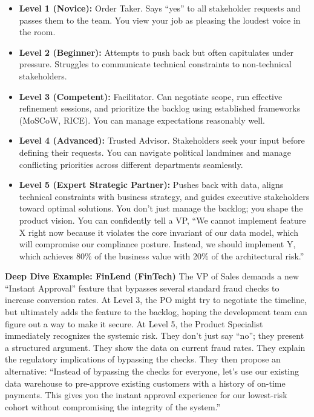 \begin{itemize}
\tightlist
\item
  \textbf{Level 1 (Novice):} Order Taker. Says ``yes'' to all
  stakeholder requests and passes them to the team. You view your job as
  pleasing the loudest voice in the room.
\item
  \textbf{Level 2 (Beginner):} Attempts to push back but often
  capitulates under pressure. Struggles to communicate technical
  constraints to non-technical stakeholders.
\item
  \textbf{Level 3 (Competent):} Facilitator. Can negotiate scope, run
  effective refinement sessions, and prioritize the backlog using
  established frameworks (MoSCoW, RICE). You can manage expectations
  reasonably well.
\item
  \textbf{Level 4 (Advanced):} Trusted Advisor. Stakeholders seek your
  input before defining their requests. You can navigate political
  landmines and manage conflicting priorities across different
  departments seamlessly.
\item
  \textbf{Level 5 (Expert Strategic Partner):} Pushes back with data,
  aligns technical constraints with business strategy, and guides
  executive stakeholders toward optimal solutions. You don't just manage
  the backlog; you shape the product vision. You can confidently tell a
  VP, ``We cannot implement feature X right now because it violates the
  core invariant of our data model, which will compromise our compliance
  posture. Instead, we should implement Y, which achieves 80\% of the
  business value with 20\% of the architectural risk.''
\end{itemize}

\textbf{Deep Dive Example: FinLend (FinTech)} The VP of Sales demands a
new ``Instant Approval'' feature that bypasses several standard fraud
checks to increase conversion rates. At Level 3, the PO might try to
negotiate the timeline, but ultimately adds the feature to the backlog,
hoping the development team can figure out a way to make it secure. At
Level 5, the Product Specialist immediately recognizes the systemic
risk. They don't just say ``no''; they present a structured argument.
They show the data on current fraud rates. They explain the regulatory
implications of bypassing the checks. They then propose an alternative:
``Instead of bypassing the checks for everyone, let's use our existing
data warehouse to pre-approve existing customers with a history of
on-time payments. This gives you the instant approval experience for our
lowest-risk cohort without compromising the integrity of the system.''

